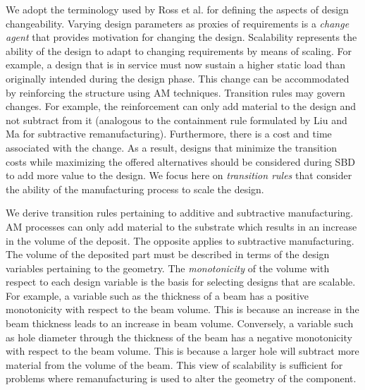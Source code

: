 We adopt the terminology used by Ross et al. \cite{Ross2008} for defining the aspects of design {changeability}. 
Varying design parameters as proxies of requirements is a \textit{change agent} that provides motivation for changing the design. {Scalability} represents the ability of the design to adapt to changing requirements by means of scaling. For example, a design that is in service must now sustain a higher static load than originally intended during the design phase. This change can be accommodated by reinforcing the structure using \ac{AM} techniques. Transition rules may govern changes. For example, the reinforcement can only add material to the design and not subtract from it (analogous to the containment rule formulated by Liu and Ma \cite{Liu2017} for subtractive remanufacturing). Furthermore, there is a cost and time associated with the change. As a result, designs that minimize the transition costs while maximizing the offered alternatives should be considered during \ac{SBD} to add more value to the design. We focus here on \textit{transition rules} that consider the ability of the manufacturing process to scale the design.

We derive transition rules pertaining to additive and subtractive manufacturing. \ac{AM} processes can only add material to the substrate which results in an increase in the volume of the deposit. The opposite applies to subtractive manufacturing. The volume of the deposited part must be described in terms of the design variables pertaining to the geometry. The \textit{monotonicity} of the volume with respect to each design variable is the basis for selecting designs that are scalable. For example, a variable such as the thickness of a beam has a positive monotonicity with respect to the beam volume. This is because an increase in the beam thickness leads to an increase in beam volume. Conversely, a variable such as hole diameter through the thickness of the beam has a negative monotonicity with respect to the beam volume. This is because a larger hole will subtract more material from the volume of the beam. This view of scalability is sufficient for problems where remanufacturing is used to alter the geometry of the component.

